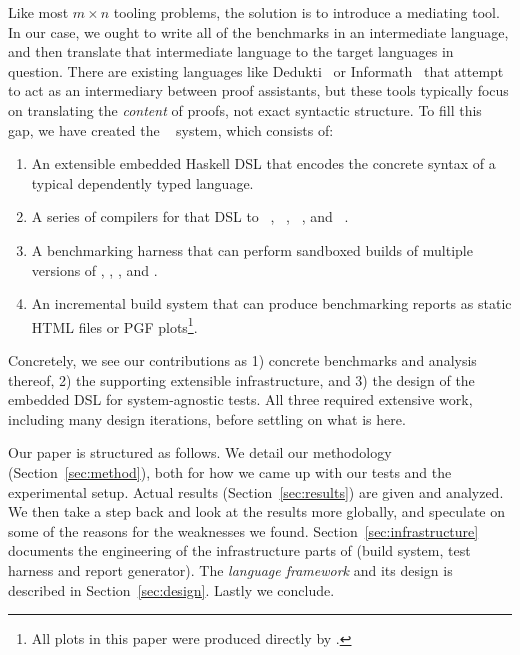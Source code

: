 \documentclass[a4paper,UKenglish,cleveref, autoref, thm-restate,anonymous]{lipics-v2021}
\begin{document}
Like most \(m \times n\) tooling problems, the solution is to introduce
a mediating tool. In our case, we ought to write all of the benchmarks
in an intermediate language, and then translate that intermediate language to
the target languages in question. There are existing languages like Dedukti~\cite{Dedukti:2023}
or Informath~\cite{Informath:2026}
that attempt to act as an intermediary between proof assistants, but these
tools typically focus on translating the \emph{content} of proofs, not exact
syntactic structure. To fill this gap, we have created the \panbench~\cite{Mullanix:2026} system, which consists of:

\begin{enumerate}
\item An extensible embedded Haskell DSL that encodes the concrete syntax of a
  typical dependently typed language.
\item A series of compilers for that DSL to \agda~\cite{AgdaDevelopers:Agda}, \idris~\cite{Brady:2021}, \lean~\cite{Lean4:2021}, and \rocq~\cite{Rocq:2026}.
\item A benchmarking harness that can perform sandboxed builds of
  multiple versions of \agda, \idris, \lean, and \rocq.
\item An incremental build system that can produce benchmarking reports as
  static HTML files or PGF plots\footnote{All plots in this paper were produced directly by \panbench.}.
\end{enumerate}

Concretely, we see our contributions as 
1) concrete benchmarks and analysis thereof,
2) the supporting extensible infrastructure, and
3) the design of the embedded \panbench DSL for system-agnostic tests.
All three required extensive work, including many design iterations, before settling on
what is here.

Our paper is structured as follows. We detail our methodology
(Section~\ref{sec:method}), both for how we came up with our tests and the experimental setup.
Actual results (Section~\ref{sec:results}) are given and analyzed. We then take a step back
and look at the results more globally, and speculate on some of the reasons for the weaknesses
we found. Section~\ref{sec:infrastructure} documents the engineering of the infrastructure parts
of \panbench (build system, test harness and report generator). The \emph{language framework}
and its design is described in Section~\ref{sec:design}. Lastly we conclude.
\end{document}
